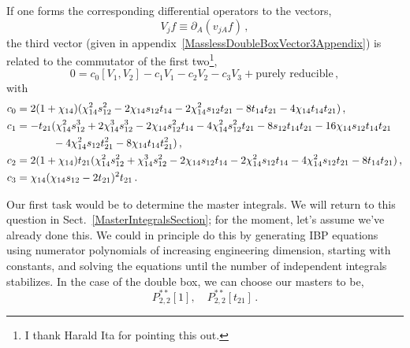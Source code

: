 \documentclass[aps,prd,preprint,groupedaddress,nofootinbib,showpacs,eqsecnum]{revtex4}
\def\sect#1{Sect.~{\ref{#1}}}
\def\Pss#1#2{P^{**}_{#1,#2}}
\begin{document}
If one forms the corresponding
differential operators to the vectors,
\begin{equation}
V_j f \equiv \partial_A (v_{jA} f)\,,
\end{equation}  
the third vector (given in
appendix~\ref{MasslessDoubleBoxVector3Appendix}) 
is related to the commutator of
the first two\footnote{I thank Harald Ita for pointing this out.},
\begin{equation}
0 = c_0 [V_1,V_2] - c_1 V_1 - c_2 V_2 - c_3 V_3 + \textrm{purely\ reducible}\,,
\end{equation}  
with
\begin{equation}
\begin{aligned}
c_0 & = 
  2 (1 + \chi_{14}) (\chi_{14}^2 s_{12}^2 - 2\chi_{14}s_{12} t_{14} -
   2 \chi_{14}^2 s_{12} t_{21} - 8 t_{14} t_{21} - 4 \chi_{14} t_{14} t_{21})
\,,\\  
c_1 & =
 -t_{21} (\chi_{14}^2 s_{12}^3 + 2 \chi_{14}^3 s_{12}^3 -
      2 \chi_{14} s_{12}^2 t_{14} - 4 \chi_{14}^2 s_{12}^2 t_{21} -
          8 s_{12} t_{14} t_{21} - 16 \chi_{14} s_{12} t_{14} t_{21} 
  \\&\hphantom{= -t_{21} (}-
              4 \chi_{14}^2 s_{12} t_{21}^2 - 8 \chi_{14} t_{14} t_{21}^2)
\,,\\  
c_2 & =
 2 (1 + \chi_{14}) t_{21} (\chi_{14}^2 s_{12}^2 + \chi_{14}^3 s_{12}^2 -
                  2 \chi_{14} s_{12} t_{14} - 2 \chi_{14}^2 s_{12} t_{14} -
                      4 \chi_{14}^2 s_{12} t_{21} - 8 t_{14} t_{21})
\,,\\  
c_3 & =
 \chi_{14} (\chi_{14} s_{12} - 2 t_{21})^2 t_{21}
\,.\\  
\end{aligned}
\end{equation}  

Our first task would be to determine the master integrals.
We will return to this question in \sect{MasterIntegralsSection};
for the moment, let's assume we've already done this.
We could in principle do this by generating IBP equations 
using numerator polynomials of increasing engineering dimension,
starting with constants, and solving the equations until the number of
independent integrals stabilizes.  
In the case of the double box, we can choose our masters to be,
\begin{equation}
\Pss22[1],\quad \Pss22[t_{21}]\,.
\label{DoubleBoxMasters}
\end{equation}
\end{document}

